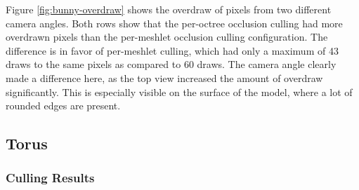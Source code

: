\noindent
Figure \ref{fig:bunny-overdraw} shows the overdraw of pixels from two different camera angles.
Both rows show that the per-octree occlusion culling had more overdrawn pixels than the 
per-meshlet occlusion culling configuration. The difference is in favor of per-meshlet 
culling, which had only a maximum of 43 draws to the same pixels as compared to 60 draws.
The camera angle clearly made a difference here, as the top view increased the amount of 
overdraw significantly. This is especially visible on the surface of the model, where a lot 
of rounded edges are present.

\clearpage




\subsection*{Torus}

\subsubsection*{Culling Results} \label{subsubsec-culling-results-torus}



